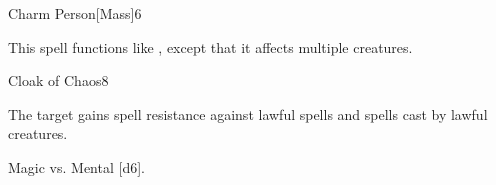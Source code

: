 \begin{spellsection}{Charm Person}[Mass]{6}
    \begin{spellheader}
    \end{spellheader}
    \begin{spellcontent}
        \begin{spelltargetinginfo}
        \end{spelltargetinginfo}
        \begin{spelleffects}
            \spellspecial This spell functions like , except that it affects multiple creatures.
        \end{spelleffects}
    \end{spellcontent}
    \begin{spellfooter}
        \miscastexplode
    \end{spellfooter}
\end{spellsection}

\begin{spellsection}{Cloak of Chaos}{8}
    \begin{spellheader}
    \end{spellheader}
    \begin{spellcontent}
        \begin{spelltargetinginfo}
        \end{spelltargetinginfo}
        \begin{spelleffects}
            \spelleffect The target gains spell resistance against lawful spells and spells cast by lawful creatures.
            \spelldur \durshort \dismissable
        \end{spelleffects}
    \end{spellcontent}
    \begin{spellsubcontent}
        \begin{spelltargetinginfo}
        \end{spelltargetinginfo}
        \begin{spelleffects}
            \begin{spellattack}{Magic vs. Mental}
                \spellsuccess {}[d6].
            \end{spellattack}
        \end{spelleffects}
    \end{spellsubcontent}
    \begin{spellfooter}
        \miscastexplode
    \end{spellfooter}
\end{spellsection}

